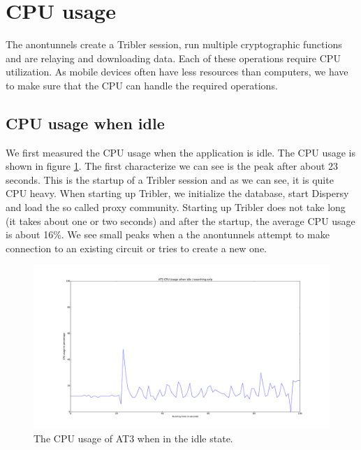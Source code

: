 \section{CPU usage}
\label{sec:cpu-usage}
	The anontunnels create a Tribler session, run multiple cryptographic functions and are relaying and downloading data. Each of these operations require CPU utilization. As mobile devices often have less resources than computers, we have to make sure that the CPU can handle the required operations.
	
	\subsection{CPU usage when idle}
		We first measured the CPU usage when the application is idle. The CPU usage is shown in figure \ref{fig:cpu_idle_graph}. The first characterize we can see is the peak after about 23 seconds. This is the startup of a Tribler session and as we can see, it is quite CPU heavy. When starting up Tribler, we initialize the database, start Dispersy and load the so called proxy community. Starting up Tribler does not take long (it takes about one or two seconds) and after the startup, the average CPU usage is about 16\%. We see small peaks when a the anontunnels attempt to make connection to an existing circuit or tries to create a new one.
	
		\begin{figure}[!htb]
			\centering
			\includegraphics[width=\textwidth]{graphics/cpu_idle.pdf}
			\caption{The CPU usage of AT3 when in the idle state.}
			\label{fig:cpu_idle_graph}
		\end{figure}
		
